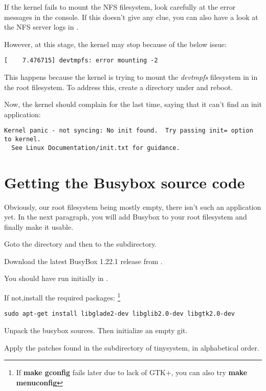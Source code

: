 If the kernel fails to mount the NFS filesystem, look carefully at the
error messages in the console. If this doesn't give any clue, you can
also have a look at the NFS server logs in .

However, at this stage, the kernel may stop because of the below
issue:

\begin{verbatim}
[    7.476715] devtmpfs: error mounting -2
\end{verbatim}

This happens because the kernel is trying to mount the {\em devtmpfs}
filesystem in  in the root filesystem. To address this,
create a  directory under  and reboot.

Now, the kernel should complain for the last time, saying that it can't
find an init application:

\footnotesize
\begin{verbatim}
Kernel panic - not syncing: No init found.  Try passing init= option to kernel.
  See Linux Documentation/init.txt for guidance.
\end{verbatim}
\normalsize
\clearpage

\section{Getting the Busybox source code}

Obviously, our root filesystem being mostly empty, there isn't such an
application yet. In the next paragraph, you will add Busybox to your root
filesystem and finally make it usable.

Goto the \labdir directory and then to the  subdirectory.

Download the latest BusyBox 1.22.1 release from .

You should have run  initially in \labdir.

If not,install the required packages:
\footnote{If {\bf make gconfig} fails later due to lack of GTK+, you can also try {\bf make menuconfig}}

\begin{verbatim}
sudo apt-get install libglade2-dev libglib2.0-dev libgtk2.0-dev
\end{verbatim}

Unpack the busybox sources. Then initialize an empty git.

Apply the patches found in the  subdirectory of {tinysystem}, in alphabetical order.

